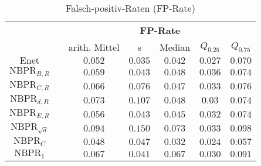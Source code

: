 \documentclass{beamer}
\begin{document}
\begin{frame}
\begin{table}[h]
\begin{tabular}{clccccc}
\multicolumn{1}{l}{}     &  & \multicolumn{5}{c}{\textbf{FP-Rate}}                        \\ \cline{3-7} 
\multicolumn{1}{l}{}     &  & arith. Mittel & s       & Median  & $Q_{0.25}$ & $Q_{0.75}$ \\ \cline{3-7} 
$\text{Enet}$            &  & $0.052$       & $0.035$ & $0.042$ & $0.027$    & $0.070$    \\
$\text{NBPR}_{B,R}$      &  & $0.059$       & $0.043$ & $0.048$ & $0.036$    & $0.074$    \\
$\text{NBPR}_{C,R}$      &  & $0.066$       & $0.076$ & $0.047$ & $0.033$    & $0.076$    \\
$\text{NBPR}_{d,R}$      &  & $0.073$       & $0.107$ & $0.048$ & $0.03$     & $0.074$    \\
$\text{NBPR}_{E,R}$      &  & $0.056$       & $0.043$ & $0.045$ & $0.032$    & $0.074$    \\
$\text{NBPR}_{\sqrt{d}}$ &  & $0.094$       & $0.150$ & $0.073$ & $0.033$    & $0.098$    \\
$\text{NBPR}_{C}$        &  & $0.048$       & $0.047$ & $0.032$ & $0.024$    & $0.057$    \\
$\text{NBPR}_{1}$        &  & $0.067$       & $0.041$ & $0.067$ & $0.030$    & $0.091$   
\end{tabular}
\caption{Falsch-positiv-Raten (FP-Rate)}
\end{table}
\end{frame}
\end{document}
